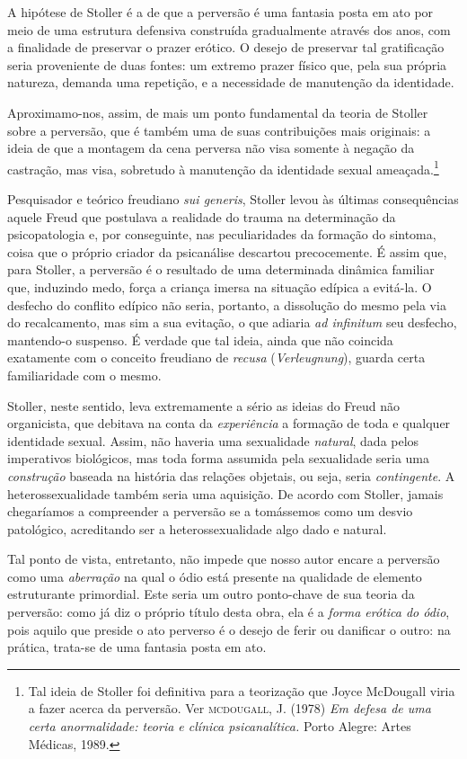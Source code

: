 A hipótese de Stoller é a de que a perversão é uma fantasia posta em ato
por meio de uma estrutura defensiva construída gradualmente através dos
anos, com a finalidade de preservar o prazer erótico. O desejo de
preservar tal gratificação seria proveniente de duas fontes: um extremo
prazer físico que, pela sua própria natureza, demanda uma repetição, e a
necessidade de manutenção da identidade.

Aproximamo-nos, assim, de mais um ponto fundamental da teoria de Stoller
sobre a perversão, que é também uma de suas contribuições mais
originais: a ideia de que a montagem da cena perversa não visa somente à
negação da castração, mas visa, sobretudo à manutenção da identidade
sexual ameaçada.\footnote{Tal ideia de Stoller foi definitiva para a
  teorização que Joyce McDougall viria a fazer acerca da perversão. Ver
  \textsc{mcdougall}, \textsc{J}. (1978) \emph{Em defesa de uma certa
  anormalidade: teoria e clínica psicanalítica.} Porto Alegre: Artes
  Médicas, 1989.}

Pesquisador e teórico freudiano \emph{sui generis}, Stoller levou às
últimas consequências aquele Freud que postulava a realidade do trauma
na determinação da psicopatologia e, por conseguinte, nas peculiaridades
da formação do sintoma, coisa que o próprio criador da psicanálise
descartou precocemente. É assim que, para Stoller, a perversão é o
resultado de uma determinada dinâmica familiar que, induzindo medo,
força a criança imersa na situação edípica a evitá-la. O desfecho do
conflito edípico não seria, portanto, a dissolução do mesmo pela via do
recalcamento, mas sim a sua evitação, o que adiaria \emph{ad infinitum}
seu desfecho, mantendo-o suspenso. É verdade que tal ideia, ainda que
não coincida exatamente com o conceito freudiano de \emph{recusa}
(\emph{Verleugnung}), guarda certa familiaridade com o mesmo.

Stoller, neste sentido, leva extremamente a sério as ideias do Freud não
organicista, que debitava na conta da \emph{experiência} a formação de
toda e qualquer identidade sexual. Assim, não haveria uma sexualidade
\emph{natural}, dada pelos imperativos biológicos, mas toda forma
assumida pela sexualidade seria uma \emph{construção} baseada na
história das relações objetais, ou seja, seria \emph{contingente}. A
heterossexualidade também seria uma aquisição. De acordo com Stoller,
jamais chegaríamos a compreender a perversão se a tomássemos como um
desvio patológico, acreditando ser a heterossexualidade algo dado e
natural.

Tal ponto de vista, entretanto, não impede que nosso autor encare a
perversão como uma \emph{aberração} na qual o ódio está presente na
qualidade de elemento estruturante primordial. Este seria um outro
ponto-chave de sua teoria da perversão: como já diz o próprio título
desta obra, ela é a \emph{forma erótica do ódio}, pois aquilo que
preside o ato perverso é o desejo de ferir ou danificar o outro: na
prática, trata-se de uma fantasia posta em ato.

